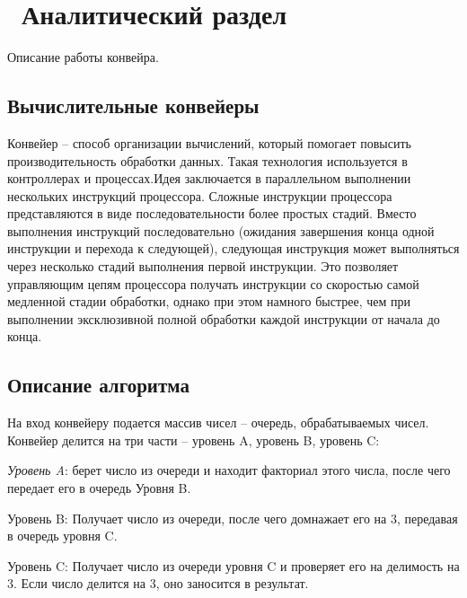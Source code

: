 \chapter{ Аналитический раздел}
\label{cha:analysis}

Описание работы конвейра.

\section { Вычислительные конвейеры}

Конвейер -- способ организации вычислений, который помогает повысить производительность обработки данных. Такая технология используется в контроллерах и процессах.Идея заключается в параллельном выполнении нескольких инструкций процессора. Сложные инструкции процессора представляются в виде последовательности более простых стадий. Вместо выполнения инструкций последовательно (ожидания завершения конца одной инструкции и перехода к следующей), следующая инструкция может выполняться через несколько стадий выполнения первой инструкции. Это позволяет управляющим цепям процессора получать инструкции со скоростью самой медленной стадии обработки, однако при этом намного быстрее, чем при выполнении эксклюзивной полной обработки каждой инструкции от начала до конца. 

\section{ Описание алгоритма}

На вход конвейеру подается массив чисел -- очередь, обрабатываемых чисел. Конвейер делится на три части -- уровень A, уровень B, уровень C:

\textit{Уровень A}: берет число из очереди и находит факториал этого числа, после чего передает его в очередь Уровня B.

Уровень B: Получает число из очереди, после чего домнажает его на 3, передавая в очередь уровня C. 

Уровень C: Получает число из очереди уровня C и проверяет его на делимость на 3. Если число делится на 3, оно заносится в результат.

